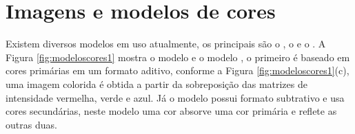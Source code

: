 \appendix
\chapter[Apêndice - IMAGENS E MODELOS DE CORES]{Imagens e modelos de cores} \label{sec:modeloscores}
\pagestyle{fancy}



Existem diversos modelos em uso atualmente, os principais são o , o  e o . A Figura \ref{fig:modeloscores1} mostra o modelo  e o modelo , o primeiro é baseado em cores primárias em um formato aditivo, conforme a Figura \ref{fig:modeloscores1}(c), uma imagem colorida  é obtida a partir da sobreposição das matrizes de intensidade vermelha, verde e azul. Já o modelo  possui formato subtrativo e usa cores secundárias,  neste modelo uma cor absorve uma cor primária e reflete as outras duas. 

